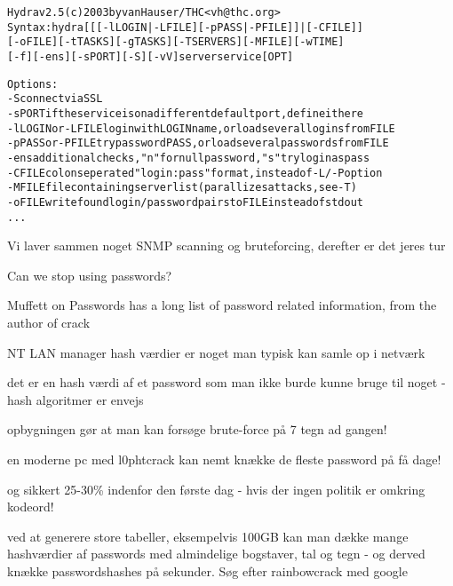 \documentclass[Screen16to9,17pt]{foils}
\begin{document}
\begin{alltt}\small
Hydra v2.5 (c) 2003 by van Hauser / THC <vh@thc.org>
Syntax: hydra [[[-l LOGIN|-L FILE] [-p PASS|-P FILE]] | [-C FILE]]
[-o FILE] [-t TASKS] [-g TASKS] [-T SERVERS] [-M FILE] [-w TIME]
[-f] [-e ns] [-s PORT] [-S] [-vV] server service [OPT]

Options:
  -S        connect via SSL
  -s PORT   if the service is on a different default port, define it here
  -l LOGIN  or -L FILE login with LOGIN name, or load several logins from FILE
  -p PASS   or -P FILE try password PASS, or load several passwords from FILE
  -e ns     additional checks, "n" for null password, "s" try login as pass
  -C FILE   colon seperated "login:pass" format, instead of -L/-P option
  -M FILE   file containing server list (parallizes attacks, see -T)
  -o FILE   write found login/password pairs to FILE instead of stdout
...
\end{alltt}



Vi laver sammen noget SNMP scanning og bruteforcing, derefter er det jeres tur





Can we stop using passwords?

Muffett on Passwords has a long list of password related information, from the author of crack 




\begin{list1}
  \item NT LAN manager hash værdier er noget man typisk kan samle op i
  netværk
\item det er en hash værdi af et password som man ikke burde kunne
  bruge til noget - hash algoritmer er envejs
\item opbygningen gør at man kan forsøge brute-force på 7 tegn ad
  gangen!
\item en moderne pc med l0phtcrack kan nemt knække de fleste password
  på få dage!
\item og sikkert 25-30\% indenfor den første dag - hvis der ingen
  politik er omkring kodeord!
\item ved at generere store tabeller, eksempelvis 100GB kan man dække
  mange hashværdier af passwords med almindelige bogstaver, tal og
  tegn - og derved knække passwordshashes på sekunder. Søg efter
  rainbowcrack med google
\end{list1}
\end{document}
